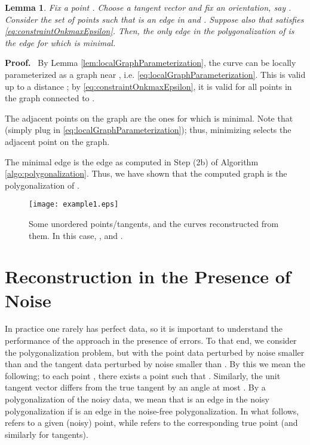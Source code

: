 \documentclass{article}
\newenvironment{proof}{
  \noindent\textbf{Proof.}\ }{\hspace*{\fill}
  \medskip}
\newtheorem{lemma}[cntr]{Lemma}
\numberwithin{cntr}{section}
\numberwithin{equation}{section}
\begin{document}
\begin{lemma}
  \label{lem:closestTangentPointInAllowedRegionIsCorrect}
  Fix a point . Choose a tangent vector  and fix an orientation, say . Consider the set of points  such that  is an edge in  and . Suppose also that  satisfies \eqref{eq:constraintOnkmaxEpsilon}.
Then, the only edge in the polygonalization of  is the edge for which  is minimal.
\end{lemma}

\begin{proof}
  By Lemma \ref{lem:localGraphParameterization}, the curve  can be locally parameterized as a graph near , i.e. \eqref{eq:localGraphParameterization}. This is valid up to a distance ; by \eqref{eq:constraintOnkmaxEpsilon}, it is valid for all points in the graph  connected to .

The adjacent points on the graph are the ones for which  is minimal. Note that  (simply plug in \eqref{eq:localGraphParameterization}); thus, minimizing  selects the adjacent point on the graph.
\end{proof}

The minimal edge is the edge  as computed in Step (2b) of Algorithm \ref{algo:polygonalization}.
Thus, we have shown that the computed graph  is the polygonalization
 of .

\begin{figure}
\setlength{\unitlength}{0.240900pt}
\ifx\plotpoint\undefined\newsavebox{\plotpoint}\fi
\sbox{\plotpoint}{\rule[-0.200pt]{0.400pt}{0.400pt}}\texttt{[image: example1.eps]}

\caption{Some unordered points/tangents, and the curves reconstructed from them. In this case, ,  and .}
\label{fig:basicExample}
\end{figure}

\section{Reconstruction in the Presence of Noise}

In practice one rarely has perfect data, so it is important to understand the performance of the approach in the presence of errors.
To that end, we consider the polygonalization problem, but with the point data perturbed by noise smaller than  and the tangent data perturbed by noise smaller than .
By this we mean the following; to each point , there exists a point  such that . Similarly, the unit tangent vector  differs from the true tangent  by an angle at most . By a polygonalization of the noisy data, we mean that  is an edge in the noisy polygonalization if  is an edge in the noise-free polygonalization. In what follows,  refers to a given (noisy) point, while  refers to the corresponding true point (and similarly for tangents).
\end{document}
